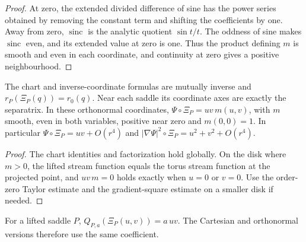 \begin{proof}
\leanok
At zero, the extended divided difference of sine has the power series
obtained by removing the constant term and shifting the coefficients by one.
Away from zero, $\operatorname{sinc}$ is the analytic quotient $\sin t/t$.
The oddness of sine makes $\operatorname{sinc}$ even, and its extended value
at zero is one. Thus the product defining $m$ is smooth and even in each
coordinate, and continuity at zero gives a positive neighbourhood.
\end{proof}

\begin{lemma}
\label{lem:saddle-normal-form}
\leanok
The chart and inverse-coordinate formulas are mutually inverse and
$r_P(\Xi_P(q))=r_0(q)$. Near each saddle its coordinate axes are exactly
the separatrix. In these orthonormal coordinates,
$\Psi\circ\Xi_P=uv\,m(u,v)$, with $m$ smooth, even in both variables,
positive near zero and $m(0,0)=1$.
In particular $\Psi\circ\Xi_P=uv+O(r^4)$ and
$|\nabla\Psi|^2\circ\Xi_P=u^2+v^2+O(r^4)$.
\end{lemma}

\begin{proof}
\leanok
The chart identities and factorization hold globally. On the disk where
$m>0$, the lifted stream function equals the torus stream function at the
projected point, and $uv\,m=0$ holds exactly when $u=0$ or $v=0$.
Use the order-zero Taylor estimate and the gradient-square estimate on a
smaller disk if needed.
\end{proof}

\begin{lemma}
\label{lem:saddle-quadratic-chart}
\leanok
For a lifted saddle $P$, $Q_{P,a}(\Xi_P(u,v))=a\,uv$.
The Cartesian and orthonormal versions therefore use the same coefficient.
\end{lemma}

